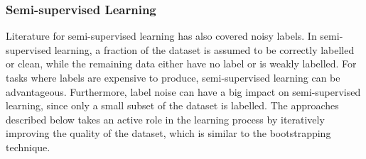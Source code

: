 











\subsubsection{Semi-supervised Learning}
Literature for semi-supervised learning has also covered noisy labels. In semi-supervised learning, a fraction of the dataset is assumed to be correctly labelled or clean, while the remaining data either have no label or is weakly labelled. For tasks where labels are expensive to produce, semi-supervised learning can be advantageous. Furthermore, label noise can have a big impact on semi-supervised learning, since only a small subset of the dataset is labelled. The approaches described below takes an active role in the learning process by iteratively improving the quality of the dataset, which is similar to the bootstrapping technique.\\

